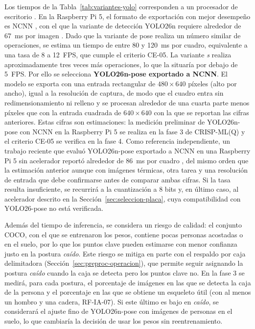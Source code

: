 \documentclass[12pt,a4paper,oneside]{book}
\theoremstyle{plain}
\theoremstyle{definition}
\theoremstyle{remark}
\begin{document}
Los tiempos de la Tabla~\ref{tab:variantes-yolo} corresponden a un procesador de escritorio \parencite{ultralytics2026pose}. En la Raspberry Pi 5, el formato de exportación con mejor desempeño es NCNN \parencite{tencent2026ncnn}, con el que la variante de detección YOLO26n requiere alrededor de 67~ms por imagen \parencite{ultralytics2026rpi}. Dado que la variante de pose realiza un número similar de operaciones, se estima un tiempo de entre 80 y 120~ms por cuadro, equivalente a una tasa de 8 a 12~FPS, que cumple el criterio CE-05. La variante \textit{s} realiza aproximadamente tres veces más operaciones, lo que la situaría por debajo de 5~FPS. Por ello se selecciona \textbf{YOLO26n-pose exportado a NCNN}. El modelo se exporta con una entrada rectangular de $480 \times 640$ píxeles (alto por ancho), igual a la resolución de captura, de modo que el cuadro entra sin redimensionamiento ni relleno y se procesan alrededor de una cuarta parte menos píxeles que con la entrada cuadrada de $640 \times 640$ con la que se reportan las cifras anteriores. Estas cifras son estimaciones: la medición preliminar de YOLO26n-pose con NCNN en la Raspberry Pi 5 se realiza en la fase 3 de CRISP-ML(Q) y el criterio CE-05 se verifica en la fase 4. Como referencia independiente, un trabajo reciente que evaluó YOLO26n-pose exportado a NCNN en una Raspberry Pi 5 sin acelerador reportó alrededor de 86~ms por cuadro \parencite{vdoviak2026thermal}, del mismo orden que la estimación anterior aunque con imágenes térmicas, otra tarea y una resolución de entrada que debe confirmarse antes de comparar ambas cifras. Si la tasa resulta insuficiente, se recurrirá a la cuantización a 8 bits y, en último caso, al acelerador descrito en la Sección~\ref{sec:seleccion-placa}, cuya compatibilidad con YOLO26-pose no está verificada.

Además del tiempo de inferencia, se considera un riesgo de calidad: el conjunto COCO, con el que se entrenaron los pesos, contiene pocas personas acostadas o en el suelo, por lo que los puntos clave pueden estimarse con menor confianza justo en la postura \textit{caído}. Este riesgo se mitiga en parte con el respaldo por caja delimitadora (Sección~\ref{sec:preproc-operacion}), que permite seguir asignando la postura \textit{caído} cuando la caja se detecta pero los puntos clave no. En la fase 3 se medirá, para cada postura, el porcentaje de imágenes en las que se detecta la caja de la persona y el porcentaje en las que se obtiene un esqueleto útil (con al menos un hombro y una cadera, RF-IA-07). Si este último es bajo en \textit{caído}, se considerará el ajuste fino de YOLO26n-pose con imágenes de personas en el suelo, lo que cambiaría la decisión de usar los pesos sin reentrenamiento.
\end{document}
